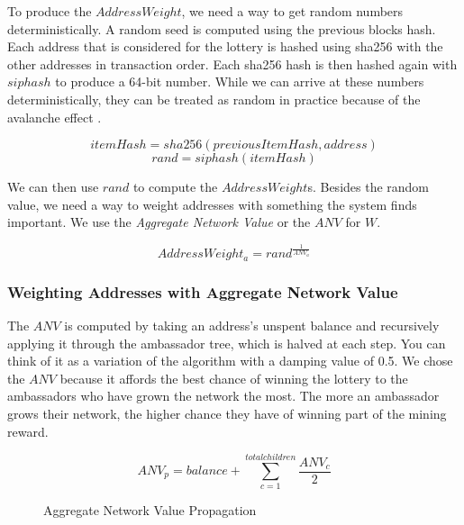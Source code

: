 \documentclass{article}
\begin{document}
To produce the $AddressWeight$, we need a way to get random numbers deterministically.
A random seed is computed using the previous blocks hash. Each address that is considered for the lottery is hashed using sha256 with the other addresses in
transaction order. Each sha256 hash is then hashed again with $siphash$ to produce
a 64-bit number. While we can arrive at these numbers deterministically, they can be treated as random 
in practice because of the avalanche effect \cite{avalanche}.

    $$itemHash = sha256(previousItemHash, address)$$
    $$rand = siphash(itemHash)$$

We can then use $rand$ to compute the $AddressWeight$s. Besides the random value,
we need a way to weight addresses with something the system finds important.
We use the \emph{Aggregate Network Value} or the $ANV$ for $W$.

$$AddressWeight_a = rand^{\frac{1}{ANV_a}}$$

\subsubsection{Weighting Addresses with Aggregate Network Value}

The $ANV$ is computed by taking an address's unspent balance and
recursively applying it through the ambassador tree, which is halved at each step.
You can think of it as a variation of the \cite{PageRank} algorithm with a damping value of 0.5.
We chose the $ANV$ because it affords the best chance of winning the lottery to
 the ambassadors who have grown the network the most.
The more an ambassador grows their network, the higher chance they have of winning
 part of the mining reward.

$$ANV_p = balance + \sum_{c=1}^{total children} \frac{ANV_c}{2}$$

\begin{figure}[H]
    \begin{center}
    \end{center}
    \caption{Aggregate Network Value Propagation}
\end{figure}
\end{document}
